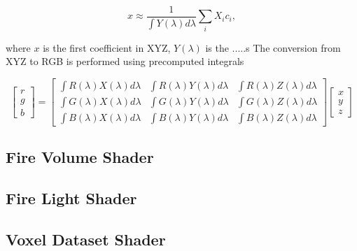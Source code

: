 \begin{equation}
x \approx \frac{1}{\int Y(\lambda) d\lambda} \sum_i X_i c_i,
\end{equation}

where $x$ is the first coefficient in XYZ, $Y(\lambda)$ is the .....s
The conversion from XYZ to RGB is performed using precomputed integrals

\begin{equation}
\begin{bmatrix}
r \\
g \\
b
\end{bmatrix}
 = 
\begin{bmatrix}
\int R(\lambda) X(\lambda) d\lambda & \int R(\lambda) Y(\lambda) d\lambda & \int R(\lambda) Z(\lambda) d\lambda \\
\int G(\lambda) X(\lambda) d\lambda & \int G(\lambda) Y(\lambda) d\lambda & \int G(\lambda) Z(\lambda) d\lambda \\
\int B(\lambda) X(\lambda) d\lambda & \int B(\lambda) Y(\lambda) d\lambda & \int B(\lambda) Z(\lambda) d\lambda
\end{bmatrix}
\begin{bmatrix}
x \\
y \\
z
\end{bmatrix}
\end{equation}

\subsection{Fire Volume Shader}
\label{sec:fire_volume_shader}



\subsection{Fire Light Shader}
\label{sec:fire_light_shader}


\subsection{Voxel Dataset Shader}
\label{sec:voxel_dataset_shader}